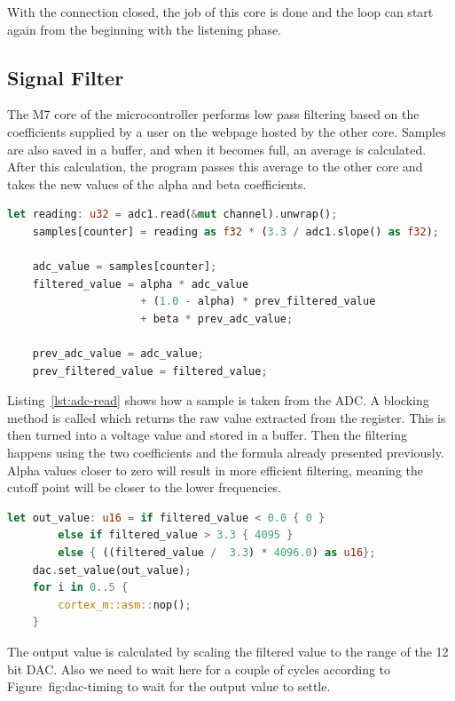 With the connection closed, the job of this core is done and the loop can start again from the beginning with the listening phase.

\subsection{Signal Filter}

The M7 core of the microcontroller performs low pass filtering based on the coefficients supplied by a user on the webpage hosted by the other core. Samples are also saved in a buffer, and when it becomes full, an average is calculated. After this calculation, the program passes this average to the other core and takes the new values of the alpha and beta coefficients.

\begin{lstlisting}[language=Rust,frame=single,float=!ht,style=customrust,label={lst:adc-read},caption={Reading and Converting Input Voltage}]
    let reading: u32 = adc1.read(&mut channel).unwrap();
    samples[counter] = reading as f32 * (3.3 / adc1.slope() as f32);

    adc_value = samples[counter];
    filtered_value = alpha * adc_value
                     + (1.0 - alpha) * prev_filtered_value
                     + beta * prev_adc_value;

    prev_adc_value = adc_value;
    prev_filtered_value = filtered_value;
\end{lstlisting}

Listing~\ref{lst:adc-read} shows how a sample is taken from the ADC. A blocking  method is called which returns the raw value extracted from the register. This is then turned into a voltage value and stored in a buffer. Then the filtering happens using the two coefficients and the formula already presented previously. Alpha values closer to zero will result in more efficient filtering, meaning the cutoff point will be closer to the lower frequencies.

\begin{lstlisting}[language=Rust,frame=single,float=!ht,style=customrust,label={lst:dac-set},caption={Setting the DAC Output Value}]
    let out_value: u16 = if filtered_value < 0.0 { 0 }
        else if filtered_value > 3.3 { 4095 }
        else { ((filtered_value /  3.3) * 4096.0) as u16};
    dac.set_value(out_value);
    for i in 0..5 {
        cortex_m::asm::nop();
    }
\end{lstlisting}

The output value is calculated by scaling the filtered value to the range of the 12 bit DAC. Also we need to wait here for a couple of cycles according to Figure~{fig:dac-timing} to wait for the output value to settle.

